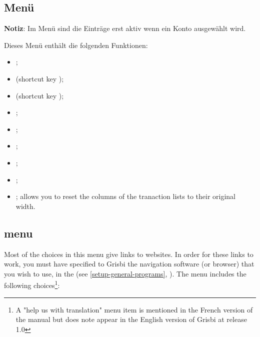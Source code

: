 \subsection{Menü \label{home-menus-display}}

\textbf{Notiz}: Im Menü  sind die Einträge erst aktiv wenn ein Konto ausgewählt wird.%

Dieses Menü enthält die folgenden Funktionen:%

\begin{itemize}
	 \item {}; 
	 \item {} (shortcut key );
	 \item {} (shortcut key );
	 \item {};
	 \item {};
	 \item {};
	 \item {};
	 \item {};
	 \item {}; allows you to reset the columns of the tranaction lists to their original width.
\end{itemize}


\subsection{ menu\label{home-menus-help}}

Most of the choices in this menu give links to websites. In order for these links to work, you must have specified to Grisbi the navigation software (or browser) that you wish to use, in the  (see \vref{setup-general-programs}, ). The  menu includes the following choices\footnote{ A "help us with translation" menu item is mentioned in the French version of the manual but does note appear in the English version of Grisbi at release 1.0}:

